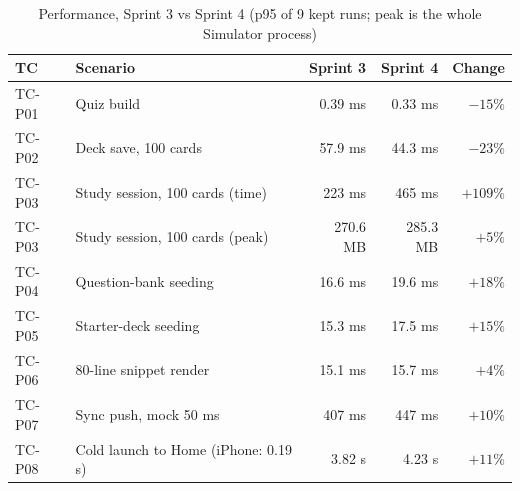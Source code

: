 \documentclass[12pt,letterpaper]{article}
\begin{document}
\begin{table}[H]
\centering
\caption{Performance, Sprint 3 vs Sprint 4 (p95 of 9 kept runs; peak is the whole Simulator process)}
\label{tab:perfcompare}
\begin{tabular}{@{}l l r r r@{}}
\toprule
\textbf{TC} & \textbf{Scenario} & \textbf{Sprint 3} & \textbf{Sprint 4} & \textbf{Change} \\
\midrule
TC-P01 & Quiz build & 0.39 ms & 0.33 ms & $-15\%$ \\
TC-P02 & Deck save, 100 cards & 57.9 ms & 44.3 ms & $-23\%$ \\
TC-P03 & Study session, 100 cards (time) & 223 ms & 465 ms & $+109\%$ \\
TC-P03 & Study session, 100 cards (peak) & 270.6 MB & 285.3 MB & $+5\%$ \\
TC-P04 & Question-bank seeding & 16.6 ms & 19.6 ms & $+18\%$ \\
TC-P05 & Starter-deck seeding & 15.3 ms & 17.5 ms & $+15\%$ \\
TC-P06 & 80-line snippet render & 15.1 ms & 15.7 ms & $+4\%$ \\
TC-P07 & Sync push, mock 50 ms & 407 ms & 447 ms & $+10\%$ \\
TC-P08 & Cold launch to Home (iPhone: 0.19 s) & 3.82 s & 4.23 s & $+11\%$ \\
\bottomrule
\end{tabular}
\end{table}
\end{document}
